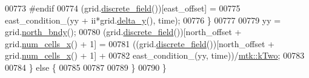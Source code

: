 \begin{DoxyCode}
00773 \textcolor{preprocessor}{      #endif}
00774       (grid.\hyperlink{classmtk_1_1UniStgGrid2D_a3e72d59843a3f9c5e47da07e5850dfe0}{discrete\_field}())[east\_offset] =
00775         east\_condition\_(yy + ii*grid.\hyperlink{classmtk_1_1UniStgGrid2D_a65a78cfc80ffdbeb282ed57af4dc5cb4}{delta\_y}(), time);
00776     \}
00777 
00779     yy = grid.\hyperlink{classmtk_1_1UniStgGrid2D_afe1ead253cdeb5503e0489eba8fd84e2}{north\_bndy}();
00780     (grid.\hyperlink{classmtk_1_1UniStgGrid2D_a3e72d59843a3f9c5e47da07e5850dfe0}{discrete\_field}())[north\_offset + grid.\hyperlink{classmtk_1_1UniStgGrid2D_a2d182866a398aba8e4829590e85bf939}{num\_cells\_x}() + 1] =
00781       ((grid.\hyperlink{classmtk_1_1UniStgGrid2D_a3e72d59843a3f9c5e47da07e5850dfe0}{discrete\_field}())[north\_offset + grid.\hyperlink{classmtk_1_1UniStgGrid2D_a2d182866a398aba8e4829590e85bf939}{num\_cells\_x}() + 1] +
00782       east\_condition\_(yy, time))/\hyperlink{group__c01-roots_gaf39c2d851a2db744f4feb1c5ab3ec2cf}{mtk::kTwo};
00783 
00784   \} \textcolor{keywordflow}{else} \{
00785 
00787 
00789   \}
00790 \}
\end{DoxyCode}
